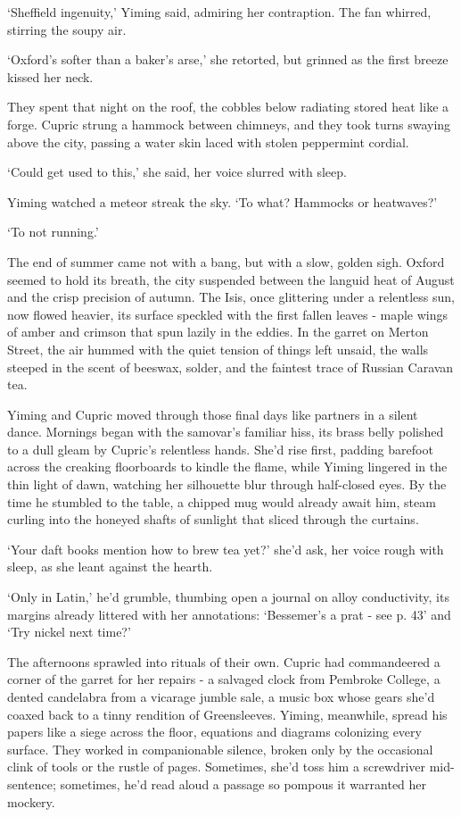 `Sheffield ingenuity,' Yiming said, admiring her contraption. The fan whirred, stirring the soupy air.

`Oxford's softer than a baker's arse,' she retorted, but grinned as the first breeze kissed her neck.

They spent that night on the roof, the cobbles below radiating stored heat like a forge. Cupric strung a hammock between chimneys, and they took turns swaying above the city, passing a water skin laced with stolen peppermint cordial.

`Could get used to this,' she said, her voice slurred with sleep.

Yiming watched a meteor streak the sky. `To what? Hammocks or heatwaves?'

`To not running.'

The end of summer came not with a bang, but with a slow, golden sigh. Oxford seemed to hold its breath, the city suspended between the languid heat of August and the crisp precision of autumn. The Isis, once glittering under a relentless sun, now flowed heavier, its surface speckled with the first fallen leaves - maple wings of amber and crimson that spun lazily in the eddies. In the garret on Merton Street, the air hummed with the quiet tension of things left unsaid, the walls steeped in the scent of beeswax, solder, and the faintest trace of Russian Caravan tea.

Yiming and Cupric moved through those final days like partners in a silent dance. Mornings began with the samovar's familiar hiss, its brass belly polished to a dull gleam by Cupric's relentless hands. She'd rise first, padding barefoot across the creaking floorboards to kindle the flame, while Yiming lingered in the thin light of dawn, watching her silhouette blur through half-closed eyes. By the time he stumbled to the table, a chipped mug would already await him, steam curling into the honeyed shafts of sunlight that sliced through the curtains.

`Your daft books mention how to brew tea yet?' she'd ask, her voice rough with sleep, as she leant against the hearth.

`Only in Latin,' he'd grumble, thumbing open a journal on alloy conductivity, its margins already littered with her annotations: `Bessemer's a prat - see p. 43' and `Try nickel next time?'

The afternoons sprawled into rituals of their own. Cupric had commandeered a corner of the garret for her repairs - a salvaged clock from Pembroke College, a dented candelabra from a vicarage jumble sale, a music box whose gears she'd coaxed back to a tinny rendition of Greensleeves. Yiming, meanwhile, spread his papers like a siege across the floor, equations and diagrams colonizing every surface. They worked in companionable silence, broken only by the occasional clink of tools or the rustle of pages. Sometimes, she'd toss him a screwdriver mid-sentence; sometimes, he'd read aloud a passage so pompous it warranted her mockery.

